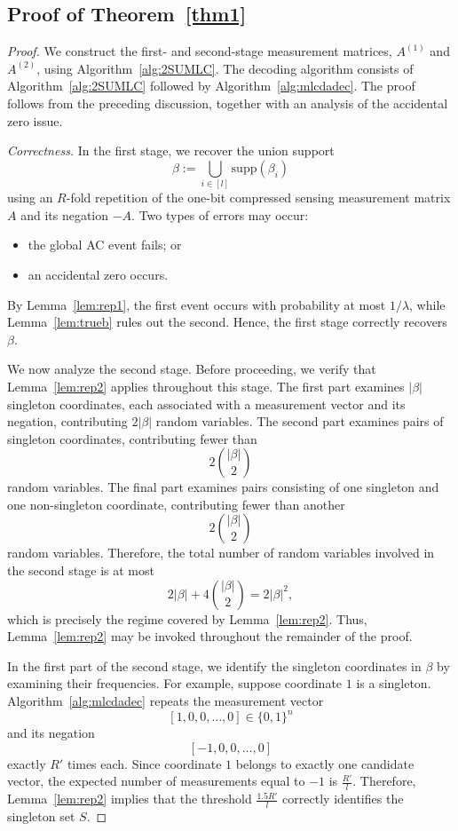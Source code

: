 \documentclass{article}
\newcommand{\supp}{\mathrm{supp}}
\begin{document}
\subsection{Proof of Theorem~\ref{thm1}}
\begin{proof}
We construct the first- and second-stage measurement matrices, $A^{(1)}$ and $A^{(2)}$, using Algorithm~\ref{alg:2SUMLC}. The decoding algorithm consists of Algorithm~\ref{alg:2SUMLC} followed by Algorithm~\ref{alg:mlcdadec}. The proof follows from the preceding discussion, together with an analysis of the accidental zero issue.

\emph{Correctness.}
In the first stage, we recover the union support
\[
\beta:=\bigcup_{i\in[l]}\supp(\beta_i)
\]
using an $R$-fold repetition of the one-bit compressed sensing measurement matrix $A$ and its negation $-A$. Two types of errors may occur:
\begin{itemize}
\item[(i)] the global AC event fails; or
\item[(ii)] an accidental zero occurs.
\end{itemize}
By Lemma~\ref{lem:rep1}, the first event occurs with probability at most $1/\lambda$, while Lemma~\ref{lem:trueb} rules out the second. Hence, the first stage correctly recovers $\beta$.

We now analyze the second stage. Before proceeding, we verify that Lemma~\ref{lem:rep2} applies throughout this stage. The first part examines $|\beta|$ singleton coordinates, each associated with a measurement vector and its negation, contributing $2|\beta|$ random variables. The second part examines pairs of singleton coordinates, contributing fewer than
\[
2\binom{|\beta|}{2}
\]
random variables. The final part examines pairs consisting of one singleton and one non-singleton coordinate, contributing fewer than another
\[
2\binom{|\beta|}{2}
\]
random variables. Therefore, the total number of random variables involved in the second stage is at most
\[
2|\beta|+4\binom{|\beta|}{2}
=2|\beta|^2,
\]
which is precisely the regime covered by Lemma~\ref{lem:rep2}. Thus, Lemma~\ref{lem:rep2} may be invoked throughout the remainder of the proof.

In the first part of the second stage, we identify the singleton coordinates in $\beta$ by examining their frequencies. For example, suppose coordinate $1$ is a singleton. Algorithm~\ref{alg:mlcdadec} repeats the measurement vector
\[
[1,0,0,\ldots,0]\in\{0,1\}^n
\]
and its negation
\[
[-1,0,0,\ldots,0]
\]
exactly $R'$ times each. Since coordinate $1$ belongs to exactly one candidate vector, the expected number of measurements equal to $-1$ is $\frac{R'}{l}$. Therefore, Lemma~\ref{lem:rep2} implies that the threshold $\frac{1.5R'}{l}$ correctly identifies the singleton set $S$.


\end{proof}
\end{document}
